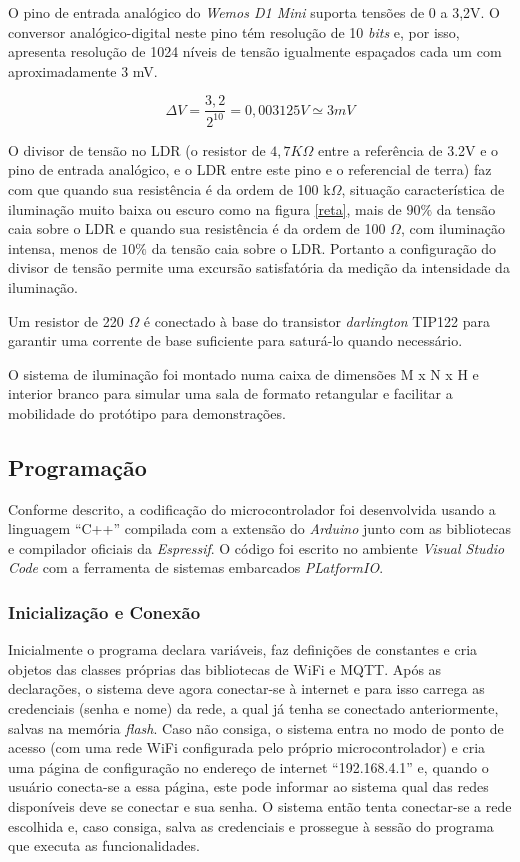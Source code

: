 O pino de entrada analógico do \textit{Wemos D1 Mini} suporta tensões de 0 a 3,2V. O conversor analógico-digital neste pino tém resolução de 10 \textit{bits} e, por isso, apresenta resolução de 1024 níveis de tensão igualmente espaçados cada um com aproximadamente 3 mV.

\begin{equation}
    \label{eq:pj_1}
    \Delta V = \frac{3,2}{2^{10}} = 0,003125 V \simeq 3 mV
\end{equation}

O divisor de tensão no LDR (o resistor de $4,7K\Omega$ entre a referência de 3.2V e o pino de entrada analógico, e o LDR entre este pino e o referencial de terra) faz com que quando sua resistência é da ordem de 100 k$\Omega$, situação característica de iluminação muito baixa ou escuro como na figura \ref{reta}, mais de $90\%$ da tensão caia sobre o LDR e quando sua resistência é da ordem de 100 $\Omega$, com iluminação intensa, menos de $10\%$ da tensão caia sobre o LDR. Portanto a configuração do divisor de tensão permite uma excursão satisfatória da medição da intensidade da iluminação.

Um resistor de 220 $\Omega$ é conectado à base do transistor \textit{darlington} TIP122 para garantir uma corrente de base suficiente para saturá-lo quando necessário.

O sistema de iluminação foi montado numa caixa de dimensões M x N x H e interior branco para simular uma sala de formato retangular e facilitar a mobilidade do protótipo para demonstrações.

\subsection{Programação}

Conforme descrito, a codificação do microcontrolador foi desenvolvida usando a linguagem ``C++'' compilada com a extensão do \textit{Arduino} junto com as bibliotecas e compilador oficiais da \textit{Espressif}. O código foi escrito no ambiente \textit{Visual Studio Code} com a ferramenta de sistemas embarcados \textit{PLatformIO}.

\subsubsection{Inicialização e Conexão}

Inicialmente o programa declara variáveis, faz definições de constantes e cria objetos das classes próprias das bibliotecas de \ac{WiFi} e \ac{MQTT}. Após as declarações, o sistema deve agora conectar-se à internet e para isso carrega as credenciais (senha e nome) da rede, a qual já tenha se conectado anteriormente, salvas na memória \textit{flash}. Caso não consiga, o sistema entra no modo de ponto de acesso (com uma rede WiFi configurada pelo próprio microcontrolador) e cria uma página de configuração no endereço de internet ``192.168.4.1'' e, quando o usuário conecta-se a essa página, este pode informar ao sistema qual das redes disponíveis deve se conectar e sua senha. O sistema então tenta conectar-se a rede escolhida e, caso consiga, salva as credenciais e prossegue à sessão do programa que executa as funcionalidades. 

